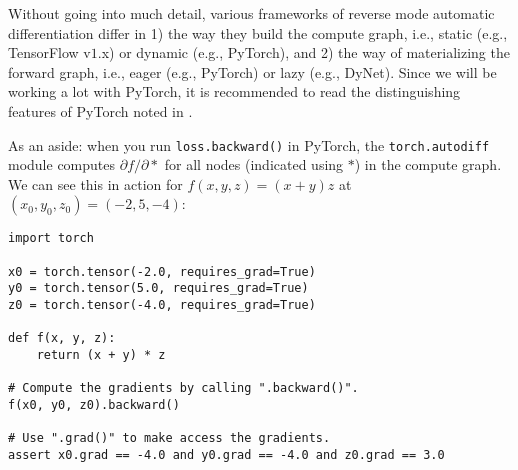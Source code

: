 Without going into much detail, various frameworks of reverse mode automatic differentiation differ in 1) the way they build the compute graph, i.e., static (e.g., TensorFlow v$1.$x) or dynamic (e.g., PyTorch), and 2) the way of materializing the forward graph, i.e., eager (e.g., PyTorch) or lazy (e.g., DyNet). Since we will be working a lot with PyTorch, it is recommended to read the distinguishing features of PyTorch noted in \cite{paszke2017automatic}.

As an aside: when you run \texttt{loss.backward()} in PyTorch, the \texttt{torch.autodiff} module computes $\partial f / \partial \ast$ for all nodes (indicated using $\ast$) in the compute graph. We can see this in action for $f(x, y, z) = (x + y) z$ at $(x_0, y_0, z_0) = (-2, 5, -4)$:

\begin{lstlisting}
import torch

x0 = torch.tensor(-2.0, requires_grad=True)
y0 = torch.tensor(5.0, requires_grad=True)
z0 = torch.tensor(-4.0, requires_grad=True)

def f(x, y, z):
    return (x + y) * z

# Compute the gradients by calling ".backward()".
f(x0, y0, z0).backward()

# Use ".grad()" to make access the gradients.
assert x0.grad == -4.0 and y0.grad == -4.0 and z0.grad == 3.0
\end{lstlisting}

